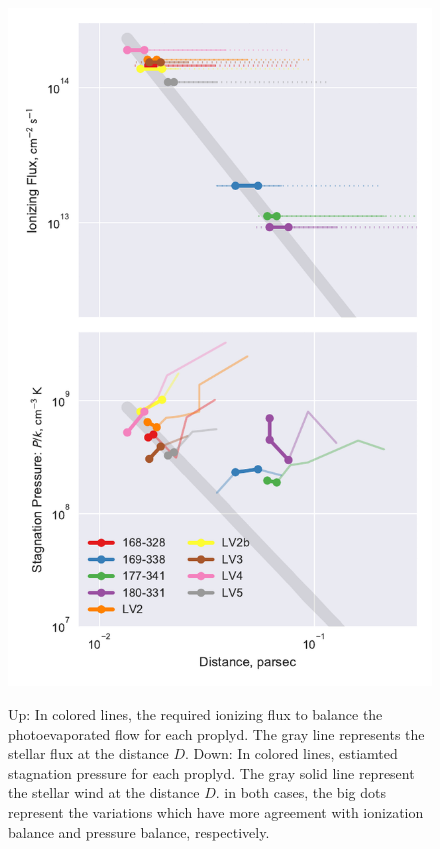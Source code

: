 \begin{figure}
\includegraphics[width=\linewidth]{../../proplyd-wind-figs/plot-wind-fits}
\label{fig:pressure}
\caption{Up: In colored lines,  the required ionizing flux to balance the photoevaporated flow for each proplyd. The gray line represents the stellar flux at the distance $D$. Down: In colored lines, estiamted stagnation pressure for each proplyd. 
The gray solid line represent the stellar wind at the distance $D$. in both cases, the big dots represent the variations which have more agreement with ionization balance and pressure balance, respectively.}
\end{figure}

